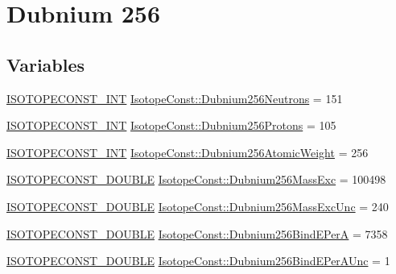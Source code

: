 \hypertarget{group___isotope_const-_dubnium-_db256}{}\section{Dubnium 256}
\label{group___isotope_const-_dubnium-_db256}
\subsection*{Variables}
\begin{DoxyCompactItemize}
\item 
\mbox{\hyperlink{group___isotope_const-_macros_ga5f18360b3e99483a35c32d789e62621c}{I\+S\+O\+T\+O\+P\+E\+C\+O\+N\+S\+T\+\_\+\+I\+NT}} \mbox{\hyperlink{group___isotope_const-_dubnium-_db256_ga18f151465e3867d292174c842c5c41d0}{Isotope\+Const\+::\+Dubnium256\+Neutrons}} = 151
\item 
\mbox{\hyperlink{group___isotope_const-_macros_ga5f18360b3e99483a35c32d789e62621c}{I\+S\+O\+T\+O\+P\+E\+C\+O\+N\+S\+T\+\_\+\+I\+NT}} \mbox{\hyperlink{group___isotope_const-_dubnium-_db256_ga8842b622a9b1c9545ab6525bbb2f37f9}{Isotope\+Const\+::\+Dubnium256\+Protons}} = 105
\item 
\mbox{\hyperlink{group___isotope_const-_macros_ga5f18360b3e99483a35c32d789e62621c}{I\+S\+O\+T\+O\+P\+E\+C\+O\+N\+S\+T\+\_\+\+I\+NT}} \mbox{\hyperlink{group___isotope_const-_dubnium-_db256_gaed1876d4071fd957476f9740dbd2c1ed}{Isotope\+Const\+::\+Dubnium256\+Atomic\+Weight}} = 256
\item 
\mbox{\hyperlink{group___isotope_const-_macros_ga8f45a7272ce02c0b4c65c44636ed719a}{I\+S\+O\+T\+O\+P\+E\+C\+O\+N\+S\+T\+\_\+\+D\+O\+U\+B\+LE}} \mbox{\hyperlink{group___isotope_const-_dubnium-_db256_ga3efe6b76057c66b08156d3a761924856}{Isotope\+Const\+::\+Dubnium256\+Mass\+Exc}} = 100498
\item 
\mbox{\hyperlink{group___isotope_const-_macros_ga8f45a7272ce02c0b4c65c44636ed719a}{I\+S\+O\+T\+O\+P\+E\+C\+O\+N\+S\+T\+\_\+\+D\+O\+U\+B\+LE}} \mbox{\hyperlink{group___isotope_const-_dubnium-_db256_gaaad8c592dfdbeda3244222f296827ce9}{Isotope\+Const\+::\+Dubnium256\+Mass\+Exc\+Unc}} = 240
\item 
\mbox{\hyperlink{group___isotope_const-_macros_ga8f45a7272ce02c0b4c65c44636ed719a}{I\+S\+O\+T\+O\+P\+E\+C\+O\+N\+S\+T\+\_\+\+D\+O\+U\+B\+LE}} \mbox{\hyperlink{group___isotope_const-_dubnium-_db256_gabb2c488b1c829ca793de4b00ce10a8bf}{Isotope\+Const\+::\+Dubnium256\+Bind\+E\+PerA}} = 7358
\item 
\mbox{\hyperlink{group___isotope_const-_macros_ga8f45a7272ce02c0b4c65c44636ed719a}{I\+S\+O\+T\+O\+P\+E\+C\+O\+N\+S\+T\+\_\+\+D\+O\+U\+B\+LE}} \mbox{\hyperlink{group___isotope_const-_dubnium-_db256_gac424f0b3a47b6395bda9a78175900da3}{Isotope\+Const\+::\+Dubnium256\+Bind\+E\+Per\+A\+Unc}} = 1

\end{DoxyCompactItemize}
